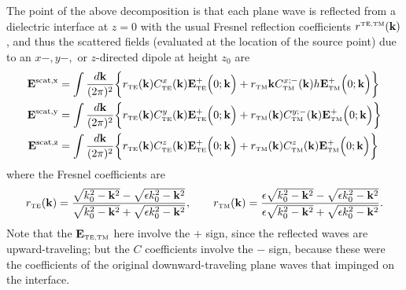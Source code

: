 \documentclass[letterpaper]{article}
\begin{document}
The point of the above decomposition is that each
plane wave is reflected from a dielectric interface
at $z=0$ with the usual Fresnel reflection coefficients
$r^{\hbox{\tiny{TE,TM}}}(\mathbf{k})$, and thus the scattered fields 
(evaluated at the location of the source point)
due to an $x-,y-,$ or $z$-directed dipole at height
$z_0$ are 
\begin{subequations}
\begin{align}
 \mathbf{E}^{\hbox{\scriptsize{scat,x}}}
&= \int \frac{d\mathbf{k}}{(2\pi)^2}
   \bigg\{ r_{\hbox{\tiny{TE}}}(\mathbf{k}) C^{x}_{\hbox{\tiny{TE}}}(\mathbf{k})
           \mathbf{E}^+_{\hbox{\tiny{TE}}}\Big(0; \mathbf{k}\Big)
           + 
           r_{\hbox{\tiny{TM}}}{\mathbf{k}} C^{x;-}_{\hbox{\tiny{TM}}}(\mathbf{k})
 h          \mathbf{E}^+_{\hbox{\tiny{TM}}}\Big(0; \mathbf{k}\Big)
    \bigg\}
\\
  \mathbf{E}^{\hbox{\scriptsize{scat,y}}}
 &= \int \frac{d \mathbf{k}}{(2\pi)^2} 
    \bigg\{ r_{\hbox{\tiny{TE}}}(\mathbf{k}) C^{y}_{\hbox{\tiny{TE}}}(\mathbf{k})
            \mathbf{E}^+_{\hbox{\tiny{TE}}}\Big(0; \mathbf{k}\Big)
           + 
            r_{\hbox{\tiny{TM}}}(\mathbf{k}) C^{y;-}_{\hbox{\tiny{TM}}}(\mathbf{k})
            \mathbf{E}^+_{\hbox{\tiny{TM}}}\Big(0; \mathbf{k}\Big)
    \bigg\}
 \\
  \mathbf{E}^{\hbox{\scriptsize{scat,z}}}
 &= \int \frac{d \mathbf{k}}{(2\pi)^2} 
    \bigg\{ r_{\hbox{\tiny{TE}}}(\mathbf{k}) C^{z}_{\hbox{\tiny{TE}}}(\mathbf{k})
            \mathbf{E}^+_{\hbox{\tiny{TE}}}\Big(0; \mathbf{k}\Big)
           + 
            r_{\hbox{\tiny{TM}}}(\mathbf{k}) C^{z}_{\hbox{\tiny{TM}}}(\mathbf{k})
            \mathbf{E}^+_{\hbox{\tiny{TM}}}\Big(0; \mathbf{k}\Big)
    \bigg\}
\end{align}
\label{ScatteredFieldsPWD}
\end{subequations}
where the Fresnel coefficients are
$$ r_{\hbox{\tiny{TE}}}(\mathbf{k})= 
   \frac{ \sqrt{k_0^2 - \mathbf{k}^2} - \sqrt{\epsilon k_0^2 - \mathbf{k}^2}}
        { \sqrt{k_0^2 - \mathbf{k}^2} + \sqrt{\epsilon k_0^2 - \mathbf{k}^2}},
  \qquad
   r_{\hbox{\tiny{TM}}}(\mathbf{k})= 
   \frac{ \epsilon \sqrt{k_0^2 - \mathbf{k}^2} - \sqrt{\epsilon k_0^2 - \mathbf{k}^2}}
        { \epsilon \sqrt{k_0^2 - \mathbf{k}^2} + \sqrt{\epsilon k_0^2 - \mathbf{k}^2}}.
$$
Note that the $\mathbf{E}_{\hbox{\tiny{TE,TM}}}$ here involve the $+$
sign, since the reflected waves are upward-traveling; 
but the $C$ coefficients involve the $-$ sign, because
these were the coefficients of the original downward-traveling
plane waves that impinged on the interface.

\end{document}
